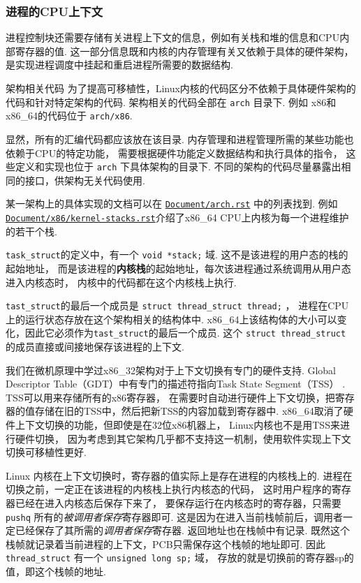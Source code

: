 \subsubsection{进程的CPU上下文} \label{context}
进程控制块还需要存储有关进程上下文的信息，例如有关栈和堆的信息和CPU内部寄存器的值.%
这一部分信息既和内核的内存管理有关又依赖于具体的硬件架构，
是实现进程调度中挂起和重启进程所需要的数据结构.
\begin{readsrcbox}{架构相关代码}
	为了提高可移植性，Linux内核的代码区分不依赖于具体硬件架构的代码和针对特定架构的代码.
	架构相关的代码全部在 \lstinline{arch} 目录下.
	例如 x86和x86\_64的代码位于 \lstinline{arch/x86}.

	显然，所有的汇编代码都应该放在该目录.
	内存管理和进程管理所需的某些功能也依赖于CPU的特定功能，
	需要根据硬件功能定义数据结构和执行具体的指令，
	这些定义和实现也位于 \lstinline{arch} 下具体架构的目录下.
	不同的架构的代码尽量暴露出相同的接口，供架构无关代码使用.

	某一架构上的具体实现的文档可以在 \href{https://docs.kernel.org/arch.html}{\lstinline{Document/arch.rst}} 中的列表找到.
	例如\href{https://docs.kernel.org/x86/kernel-stacks.html}{\lstinline{Document/x86/kernel-stacks.rst}}介绍了x86\_64 CPU上内核为每一个进程维护的若干个栈.
\end{readsrcbox}
\lstinline{task_struct}的定义中，有一个 \lstinline{void *stack;} 域.
这不是该进程的用户态的栈的起始地址，
而是该进程的\textbf{内核栈}的起始地址，每次该进程通过系统调用从用户态进入内核态时，
内核中的代码都在这个内核栈上执行.

\lstinline{tast_struct}的最后一个成员是 \lstinline{struct thread_struct thread;}%
，
进程在CPU上的运行状态存放在这个架构相关的结构体中.
x86\_64上该结构体的大小可以变化，因此它必须作为\lstinline{tast_struct}的最后一个成员.
这个 \lstinline{struct thread_struct} 的成员直接或间接地保存该进程的上下文.

我们在微机原理中学过x86\_32架构对于上下文切换有专门的硬件支持.
Global Descriptor Table（GDT）中有专门的描述符指向Task State Segment（TSS）%
.
TSS可以用来存储所有的x86寄存器，
在需要时自动进行硬件上下文切换，把寄存器的值存储在旧的TSS中，然后把新TSS的内容加载到寄存器中.
x86\_64取消了硬件上下文切换的功能，但即使是在32位x86机器上，
Linux内核也不是用TSS来进行硬件切换，
因为考虑到其它架构几乎都不支持这一机制，使用软件实现上下文切换可移植性更好.

Linux 内核在上下文切换时，寄存器的值实际上是存在进程的内核栈上的.
进程在切换之前，一定正在该进程的内核栈上执行内核态的代码，
这时用户程序的寄存器已经在进入内核态后保存下来了，
要保存运行在内核态时的寄存器，只需要 \lstinline{pushq} 所有的\textit{被调用者保存}寄存器即可.
这是因为在进入当前栈帧前后，调用者一定已经保存了其所需的\textit{调用者保存}寄存器.
返回地址也在栈帧中有记录.
既然这个栈帧就记录着当前进程的上下文，PCB只需保存这个栈帧的地址即可.
因此 \lstinline{thread_struct} 有一个 \lstinline{unsigned long sp;} 域，
存放的就是切换前的寄存器sp的值，即这个栈帧的地址.

